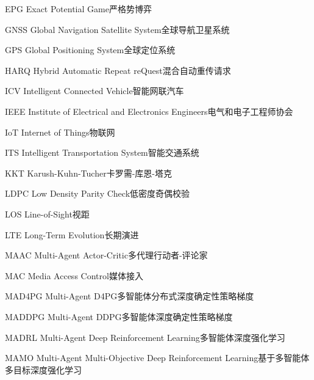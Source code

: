 \begin{abbreviate}[0mm][18mm]
\item[EPG] Exact Potential Game\hspace{1em}严格势博弈
\item[GNSS] Global Navigation Satellite System\hspace{1em}全球导航卫星系统
\item[GPS] Global Positioning System\hspace{1em}全球定位系统
\item[HARQ] Hybrid Automatic Repeat reQuest\hspace{1em}混合自动重传请求
\item[ICV] Intelligent Connected Vehicle\hspace{1em}智能网联汽车
\item[IEEE] Institute of Electrical and Electronics Engineers\hspace{1em}电气和电子工程师协会
\item[IoT] Internet of Things\hspace{1em}物联网
\item[ITS] Intelligent Transportation System\hspace{1em}智能交通系统
\item[KKT] Karush-Kuhn-Tucher\hspace{1em}卡罗需-库恩-塔克
\item[LDPC] Low Density Parity Check\hspace{1em}低密度奇偶校验
\item[LOS] Line-of-Sight\hspace{1em}视距
\item[LTE] Long-Term Evolution\hspace{1em}长期演进
\item[MAAC] Multi-Agent Actor-Critic\hspace{1em}多代理行动者-评论家
\item[MAC] Media Access Control\hspace{1em}媒体接入
\item[MAD4PG] Multi-Agent D4PG\hspace{1em}多智能体分布式深度确定性策略梯度
\item[MADDPG] Multi-Agent DDPG\hspace{1em}多智能体深度确定性策略梯度
\item[MADRL] Multi-Agent Deep Reinforcement Learning\hspace{1em}多智能体深度强化学习
\item[MAMO] Multi-Agent Multi-Objective Deep Reinforcement Learning\hspace{1em}基于多智能体多目标深度强化学习

\end{abbreviate}
